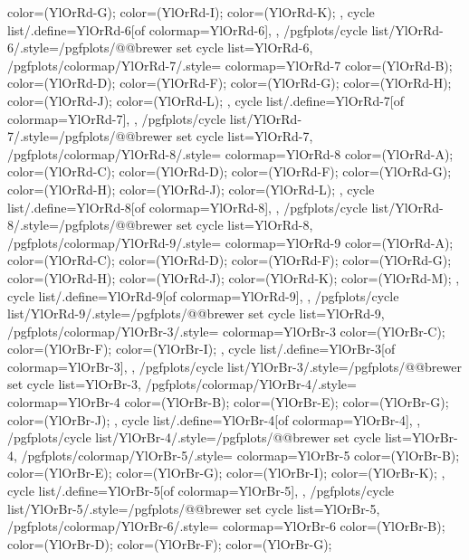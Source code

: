 {{{      color=(YlOrRd-G);
      color=(YlOrRd-I);
      color=(YlOrRd-K);
    },
    cycle list/.define={YlOrRd-6}{[of colormap=YlOrRd-6]},
  },
  /pgfplots/cycle list/YlOrRd-6/.style={/pgfplots/@@brewer set cycle list={YlOrRd-6}},
  /pgfplots/colormap/YlOrRd-7/.style={
    colormap={YlOrRd-7}{
      color=(YlOrRd-B);
      color=(YlOrRd-D);
      color=(YlOrRd-F);
      color=(YlOrRd-G);
      color=(YlOrRd-H);
      color=(YlOrRd-J);
      color=(YlOrRd-L);
    },
    cycle list/.define={YlOrRd-7}{[of colormap=YlOrRd-7]},
  },
  /pgfplots/cycle list/YlOrRd-7/.style={/pgfplots/@@brewer set cycle list={YlOrRd-7}},
  /pgfplots/colormap/YlOrRd-8/.style={
    colormap={YlOrRd-8}{
      color=(YlOrRd-A);
      color=(YlOrRd-C);
      color=(YlOrRd-D);
      color=(YlOrRd-F);
      color=(YlOrRd-G);
      color=(YlOrRd-H);
      color=(YlOrRd-J);
      color=(YlOrRd-L);
    },
    cycle list/.define={YlOrRd-8}{[of colormap=YlOrRd-8]},
  },
  /pgfplots/cycle list/YlOrRd-8/.style={/pgfplots/@@brewer set cycle list={YlOrRd-8}},
  /pgfplots/colormap/YlOrRd-9/.style={
    colormap={YlOrRd-9}{
      color=(YlOrRd-A);
      color=(YlOrRd-C);
      color=(YlOrRd-D);
      color=(YlOrRd-F);
      color=(YlOrRd-G);
      color=(YlOrRd-H);
      color=(YlOrRd-J);
      color=(YlOrRd-K);
      color=(YlOrRd-M);
    },
    cycle list/.define={YlOrRd-9}{[of colormap=YlOrRd-9]},
  },
  /pgfplots/cycle list/YlOrRd-9/.style={/pgfplots/@@brewer set cycle list={YlOrRd-9}},
  /pgfplots/colormap/YlOrBr-3/.style={
    colormap={YlOrBr-3}{
      color=(YlOrBr-C);
      color=(YlOrBr-F);
      color=(YlOrBr-I);
    },
    cycle list/.define={YlOrBr-3}{[of colormap=YlOrBr-3]},
  },
  /pgfplots/cycle list/YlOrBr-3/.style={/pgfplots/@@brewer set cycle list={YlOrBr-3}},
  /pgfplots/colormap/YlOrBr-4/.style={
    colormap={YlOrBr-4}{
      color=(YlOrBr-B);
      color=(YlOrBr-E);
      color=(YlOrBr-G);
      color=(YlOrBr-J);
    },
    cycle list/.define={YlOrBr-4}{[of colormap=YlOrBr-4]},
  },
  /pgfplots/cycle list/YlOrBr-4/.style={/pgfplots/@@brewer set cycle list={YlOrBr-4}},
  /pgfplots/colormap/YlOrBr-5/.style={
    colormap={YlOrBr-5}{
      color=(YlOrBr-B);
      color=(YlOrBr-E);
      color=(YlOrBr-G);
      color=(YlOrBr-I);
      color=(YlOrBr-K);
    },
    cycle list/.define={YlOrBr-5}{[of colormap=YlOrBr-5]},
  },
  /pgfplots/cycle list/YlOrBr-5/.style={/pgfplots/@@brewer set cycle list={YlOrBr-5}},
  /pgfplots/colormap/YlOrBr-6/.style={
    colormap={YlOrBr-6}{
      color=(YlOrBr-B);
      color=(YlOrBr-D);
      color=(YlOrBr-F);
      color=(YlOrBr-G);
}}}
